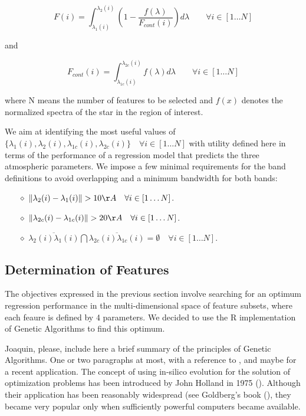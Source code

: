 \begin{equation}\label{eq:feature}
  F(i) =  \int_{\lambda_{1}(i)}^{\lambda_{2}(i)} \left( 1 - \frac{f(\lambda)}{F_{cont}(i)}\right) d{\lambda}  \quad \quad \forall i \in [1 \ldots N]
\end{equation}

and 

\begin{equation}\label{eq:cont}
 F_{cont}(i) =  \int_{\lambda_{1c}(i)}^{\lambda_{2c}(i)} f(\lambda) d{\lambda}   \quad \quad \forall i \in [1 \ldots N]
\end{equation}

where N means the number of features to be selected and $f(x)$ denotes
the normalized spectra of the star in the region of interest.


We aim at identifying the most useful values of
$\{\lambda_{1}(i),\lambda_{2}(i), \lambda_{1c}(i),\lambda_{2c}(i)\}
\quad \forall i \in [1 \ldots N] $ with utility defined here in terms
of the performance of a regression model that predicts the three
atmospheric parameters. We impose a few minimal requirements for the
band definitions to avoid overlapping and a minimum bandwidth for both
bands:

\begin{itemize}
 \item[$\diamond$]{ $ \lVert \lambda_{2}(i) - \lambda_{1}(i) \rVert  > 10 \AA \quad \forall i \in [1 \ldots N]$.}
 \item[$\diamond$]{ $ \lVert \lambda_{2c}(i) - \lambda_{1c}(i) \rVert  > 20 \AA \quad \forall i \in [1 \ldots N]$.} 
 \item[$\diamond$]{ $ \overline{\lambda_{2}(i)\lambda_{1}(i)}  \bigcap 
                      \overline{\lambda_{2c}(i)\lambda_{1c}(i)} = \emptyset \quad \forall i \in [1 \ldots N]$.}
\end{itemize}


\subsection{Determination of Features}
\label{subsec:DF}

The objectives expressed in the previous section involve searching for
an optimum regression performance in the multi-dimensional space of
feature subsets, where each feaure is defined by 4 parameters.  We
decided to use the R \citep{R2013} implementation of Genetic
Algorithms to find this optimum.

Joaquin, please, include here a brief summary of the principles of
Genetic Algorithms. One or two paragraphs at most, with a reference to
\cite{1995ApJS..101..309C}, and maybe \cite{2013A&A...550A..74D} for a
recent application.  The concept of using in-silico evolution for the
solution of optimization problems has been introduced by John Holland
in 1975 (\cite{holland1975adaptation}). Although their application has
been reasonably widespread (see Goldberg\textquoteright s book
(\cite{goldberg1989genetic}), they became very popular only when
sufficiently powerful computers became available.


